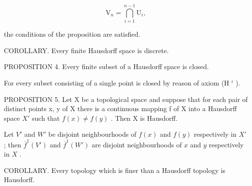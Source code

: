 \[
\mathrm{V} _ {n} = \bigcap_ {i = 1} ^ {n - 1} \mathrm{U} _ {i},
\]

the conditions of the proposition are satisfied.

COROLLARY. Every finite Hausdorff space is discrete.

PROPOSITION 4. Every finite subset of a Hausdorff space is closed.

For every subset consisting of a single point is closed by reason of axiom (H \(^{i}\) ).

PROPOSITION 5. Let X be a topological space and suppose that for each pair of distinct points x, y of X there is a continuous mapping f of X into a Hausdorff space \(X'\) such that \(f(x) \neq f(y)\) . Then X is Hausdorff.

Let \(V'\) and \(W'\) be disjoint neighbourhoods of \(f(x)\) and \(f(y)\) respectively in \(X'\) ; then \(\overline{f}^1(V')\) and \(\overline{f}^1(W')\) are disjoint neighbourhoods of \(x\) and \(y\) respectively in \(X\) .

COROLLARY. Every topology which is finer than a Hausdorff topology is Hausdorff.

